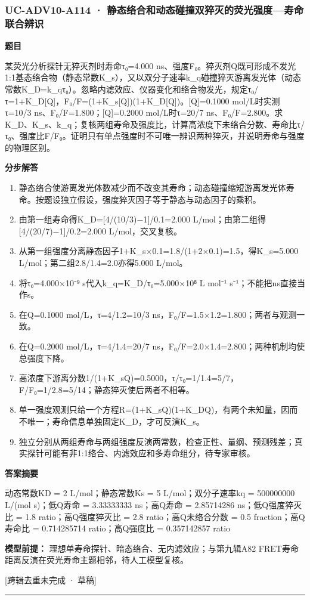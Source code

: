 \documentclass[UTF8,11pt,a4paper]{ctexart}
\begin{document}
\subsubsection*{UC-ADV10-A114 · 静态络合和动态碰撞双猝灭的荧光强度—寿命联合辨识}
\noindent\textbf{题目}\par
某荧光分析探针无猝灭剂时寿命τ₀=4.000 ns、强度F₀。猝灭剂Q既可形成不发光1:1基态络合物（静态常数K\_s），又以双分子速率k\_q碰撞猝灭游离发光体（动态常数K\_D=k\_qτ₀）。忽略内滤效应、仪器变化和络合物发光，规定τ₀/τ=1+K\_D[Q]，F₀/F=(1+K\_s[Q])(1+K\_D[Q])。[Q]=0.1000 mol/L时实测τ=10/3 ns、F₀/F=1.800；[Q]=0.2000 mol/L时τ=20/7 ns、F₀/F=2.800。求K\_D、K\_s、k\_q；复核两组寿命及强度比，计算高浓度下未络合分数、寿命比τ/τ₀、强度比F/F₀。证明只有单点强度时不可唯一辨识两种猝灭，并说明寿命与强度的物理区别。\par
\medskip\noindent\textbf{分步解答}
\begin{enumerate}
\item 静态络合使游离发光体数减少而不改变其寿命；动态碰撞缩短游离发光体寿命。按题设独立假设，强度猝灭因子等于静态与动态因子的乘积。
\item 由第一组寿命得K\_D=[4/(10/3)−1]/0.1=2.000 L/mol；由第二组得[4/(20/7)−1]/0.2=2.000 L/mol，交叉复核。
\item 从第一组强度分离静态因子1+K\_s×0.1=1.8/(1+2×0.1)=1.5，得K\_s=5.000 L/mol；第二组2.8/1.4=2.0亦得5.000 L/mol。
\item 将τ₀=4.000×10⁻⁹ s代入k\_q=K\_D/τ₀=5.000×10⁸ L mol⁻¹ s⁻¹；不能把ns直接当作s。
\item 在Q=0.1000 mol/L，τ=4/1.2=10/3 ns，F₀/F=1.5×1.2=1.800；两者与观测一致。
\item 在Q=0.2000 mol/L，τ=4/1.4=20/7 ns，F₀/F=2.0×1.4=2.800；两种机制均使总强度下降。
\item 高浓度下游离分数1/(1+K\_sQ)=0.5000，τ/τ₀=1/1.4=5/7，F/F₀=1/2.8=5/14；静态猝灭使后两者不相等。
\item 单一强度观测只给一个方程R=(1+K\_sQ)(1+K\_DQ)，有两个未知量，因而不唯一；寿命信息单独固定K\_D，才可反演K\_s。
\item 独立分别从两组寿命与两组强度反演两常数，检查正性、量纲、预测残差；真实探针可能有非1:1络合、内滤效应和多寿命组分，待专家审核。
\end{enumerate}
\noindent\textbf{答案摘要}\par
动态常数KD = 2 L/mol；静态常数Ks = 5 L/mol；双分子速率kq = 500000000 L/(mol s)；低Q寿命 = 3.33333333 ns；高Q寿命 = 2.85714286 ns；低Q强度猝灭比 = 1.8 ratio；高Q强度猝灭比 = 2.8 ratio；高Q未络合分数 = 0.5 fraction；高Q寿命比 = 0.714285714 ratio；高Q强度比 = 0.357142857 ratio\par
\noindent\textbf{模型前提：}
理想单寿命探针、暗态络合、无内滤效应；与第九辑A82 FRET寿命距离反演在荧光寿命主题相邻，待人工模型复核。\par
\noindent\textcolor{red!65!black}{[跨辑去重未完成 · 草稿]} \par
\medskip\hrule\medskip
{}
\end{document}
